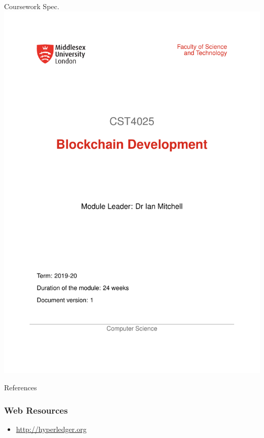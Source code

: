 \documentclass[pdf,table]{beamer}
\begin{document}
\begin{frame}{Coursework Spec.}
	\includegraphics[page=17, scale=0.250]{../../hb/4025hb.pdf}
\end{frame}




\begin{frame}{References}
	\printbibliography
\end{frame}
	
\begin{frame}
	\frametitle{Web Resources}
	\begin{itemize}
	\item \url{http://hyperledger.org}
	\end{itemize}
\end{frame}
\end{document}
